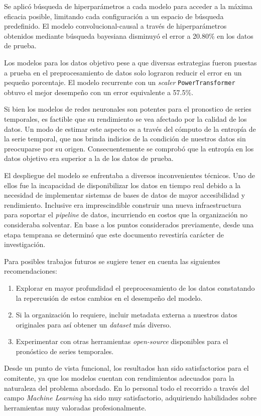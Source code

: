 \documentclass[a4paper,12pt]{article}
\begin{document}
		Se aplicó búsqueda de hiperparámetros a cada modelo para acceder a la máxima eficacia posible, limitando cada configuración a un espacio de búsqueda predefinido. El modelo convolucional-causal a través de hiperparámetros obtenidos mediante búsqueda bayesiana disminuyó el error a 20.80\% en los datos de prueba.
				
		Los modelos para los datos objetivo pese a que diversas estrategias fueron puestas a prueba en el preprocesamiento de datos solo lograron reducir el error en un pequeño porcentaje. El modelo recurrente con un \textit{scaler} \texttt{PowerTransformer} obtuvo el mejor desempeño con un error equivalente a 57.5\%.
				
		Si bien los modelos de redes neuronales son potentes para el pronostico de series temporales, es factible que su rendimiento se vea afectado por la calidad de los datos. Un modo de estimar este aspecto es a través del cómputo de la entropía de la serie temporal, que nos brinda indicios de la condición de nuestros datos sin preocuparse por su origen. Consecuentemente se comprobó que la entropía en los datos objetivo era superior a la de los datos de prueba.
				
		El despliegue del modelo se enfrentaba a diversos inconvenientes técnicos. Uno de ellos fue la incapacidad de disponibilizar los datos en tiempo real debido a la necesidad de implementar sistemas de bases de datos de mayor accesibilidad y rendimiento. Inclusive era imprescindible construir una nueva infraestructura para soportar el \textit{pipeline} de datos, incurriendo en costos que la organización no consideraba solventar. En base a los puntos considerados previamente, desde una etapa temprana se determinó que este documento revestiría carácter de investigación.
				
		Para posibles trabajos futuros se sugiere tener en cuenta las siguientes recomendaciones:
				
		\begin{enumerate}[noitemsep, topsep=2pt]
			\item Explorar en mayor profundidad el preprocesamiento de los datos constatando la repercusión de estos cambios en el desempeño del modelo.
			\item Si la organización lo requiere, incluir metadata externa a nuestros datos originales para así obtener un \textit{dataset} más diverso.
			\item Experimentar con otras herramientas \textit{open-source} disponibles para el pronóstico de series temporales.
		\end{enumerate}
				
		Desde un punto de vista funcional, los resultados han sido satisfactorios para el comitente, ya que los modelos cuentan con rendimientos adecuados para la naturaleza del problema abordado. En lo personal todo el recorrido a través del campo \textit{Machine Learning} ha sido muy satisfactorio, adquiriendo habilidades sobre herramientas muy valoradas profesionalmente.
				
		\clearpage
				
		{}
		
				
\end{document}
